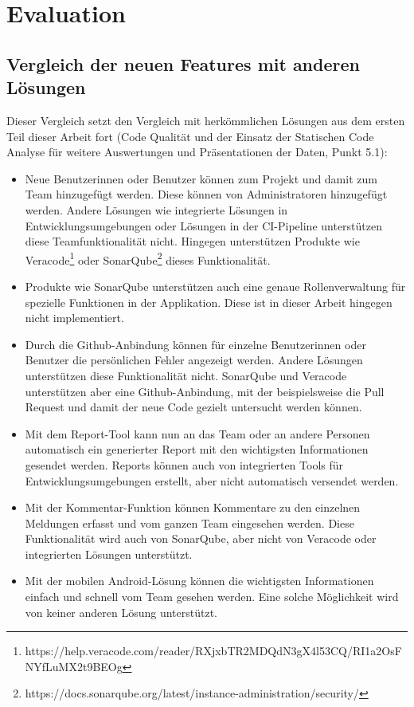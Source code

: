 \chapter{Evaluation}
\label{Evaluierung}
\chapterstart
\section{Vergleich der neuen Features mit anderen Lösungen}
Dieser Vergleich setzt den Vergleich mit herkömmlichen Lösungen aus dem ersten Teil dieser Arbeit fort (Code Qualität und der Einsatz der Statischen Code Analyse für weitere Auswertungen und Präsentationen der Daten, Punkt 5.1):

\begin{itemize} 
\item Neue Benutzerinnen oder Benutzer können zum Projekt und damit zum Team hinzugefügt werden. Diese können von Administratoren hinzugefügt werden. Andere Lösungen wie integrierte Lösungen in Entwicklungsumgebungen oder Lösungen in der CI-Pipeline unterstützen diese Teamfunktionalität nicht. Hingegen unterstützen Produkte wie Veracode\footnote{https://help.veracode.com/reader/RXjxbTR2MDQdN3gX4l53CQ/RI1a2OsFNYfLuMX2t9BEOg} oder SonarQube\footnote{https://docs.sonarqube.org/latest/instance-administration/security/} dieses Funktionalität.
\item Produkte wie SonarQube unterstützen auch eine genaue Rollenverwaltung für spezielle Funktionen in der Applikation. Diese ist in dieser Arbeit hingegen nicht implementiert.
\item Durch die Github-Anbindung können für einzelne Benutzerinnen oder Benutzer die persönlichen Fehler angezeigt werden. Andere Lösungen unterstützen diese Funktionalität nicht. SonarQube und Veracode unterstützen aber eine Github-Anbindung, mit der beispielsweise die Pull Request und damit der neue Code gezielt untersucht werden können.
\item Mit dem Report-Tool kann nun an das Team oder an andere Personen automatisch ein generierter Report mit den wichtigsten Informationen gesendet werden. Reports können auch von integrierten Tools für Entwicklungsumgebungen erstellt, aber nicht automatisch versendet werden.
\item Mit der Kommentar-Funktion können Kommentare zu den einzelnen Meldungen erfasst und vom ganzen Team eingesehen werden. Diese Funktionalität wird auch von SonarQube, aber nicht von Veracode oder integrierten Lösungen unterstützt.
\item Mit der mobilen Android-Lösung können die wichtigsten Informationen einfach und schnell vom Team gesehen werden. Eine solche Möglichkeit wird von keiner anderen Lösung unterstützt.
\end{itemize}

